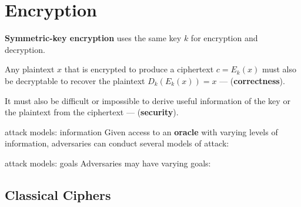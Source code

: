 \section{Encryption}

\textbf{Symmetric-key encryption} uses the same key $k$ for encryption and decryption.

Any plaintext $x$ that is encrypted to produce a ciphertext $c = E_k(x)$ must also be decryptable to recover the plaintext $D_k(E_k(x)) = x$ --- (\textbf{correctness}).

It must also be difficult or impossible to derive useful information of the key or the plaintext from the ciphertext --- (\textbf{security}).

\begin{defn}{attack models: information}
    Given access to an \textbf{oracle} with varying levels of information, adversaries can conduct several models of attack:

    \begin{itemize}
    \end{itemize}
\end{defn}

\begin{defn}{attack models: goals}
    Adversaries may have varying goals:
    \begin{itemize}
    \end{itemize}
\end{defn}

\subsection{Classical Ciphers}

